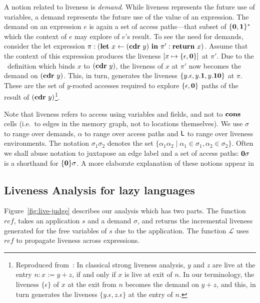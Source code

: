 \documentclass[9pt]{sigplanconf}
\begin{document}
A  notion  related  to  liveness  is  {\em  demand}.   While  liveness
represents the future use of variables, a demand represents the future
use of the value of an  expression. The demand on an expression $e$ is
again a  set of  access paths---that subset  of $\{\mathbf{0},\mathbf{1}\}^\ast$
which the context of $e$ may explore of $e$'s result.  To see the need
for  demands,  consider   the  let  expression  $\pi:(\mbox{$\mathbf{ let}$}~x\leftarrow
(\mbox{$\mathbf{cdr}$}~y)~\mbox{$\mathbf{ in}$}~  \pi':\mbox{$\mathbf{ return}$}~x)$.   Assume that  the  context of  this
expression produces  the liveness $[x \mapsto  \lbrace \epsilon, \mathbf{0}
  \rbrace]$ at $\pi'$.  Due to the \LET\ definition which binds $x$ to
$(\mbox{$\mathbf{cdr}$}~y)$, the  liveness of $x$ at  $\pi'$ now becomes  the demand on
$(\mbox{$\mathbf{cdr}$}~y)$.    This,  in   turn,  generates   the   liveness  $\lbrace
y.\epsilon, y.\mathbf{1}, y.\mathbf{1}\mathbf{0} \rbrace$ at $\pi$. These are the set
of $y$-rooted  accesses required  to explore $\lbrace  \epsilon, \mathbf{0}
\rbrace$  paths   of  the  result   of  $(\mbox{$\mathbf{cdr}$}~y)$\footnote{Reproduced
  from~\cite{asati14lgc}: In  classical strong liveness  analysis, $y$
  and $z$  are live at the  entry $n: x:=y+z$,  if and only if  $x$ is
  live  at exit  of $n$.   In our  terminology, the  liveness $\lbrace
  \epsilon\rbrace $ of $x$ at the  exit from $n$ becomes the demand on
  $y+z$, and this, in turn generates the liveness $\lbrace y.\epsilon,
  z.\epsilon \rbrace$ at the entry of $n$.}.


Note that  liveness refers to  access using variables and  fields, and
not  to $\mbox{$\mathbf{cons}$}$  cells (i.e.\  to edges  in the  memory graph,  not to
locations themselves).
We use $\sigma$  to range over demands, $\alpha$  to range over access
paths  and $\mathsf{L}$ to  range over  liveness environments.   The notation
$\sigma_1\sigma_2$  denotes  the  set $\lbrace  \alpha_1\alpha_2  \mid
\alpha_1 \in \sigma_1, \alpha_2  \in \sigma_2\rbrace$.  Often we shall
abuse notation to  juxtapose an edge label and a  set of access paths:
$\mathbf{0}\sigma$ is a shorthand for $\lbrace\mathbf{0}\rbrace\sigma$. A more
elaborate explanation of these notions appear in \cite{asati14lgc}


\subsection{Liveness Analysis for lazy languages}
\label{sec:liveness-analysis}
Figure~\ref{fig:live-judge}  describes  our  analysis  which  has  two
parts. The function $\mathit{ref}$,  takes  an application $s$ and
a demand $\sigma$, and returns  the incremental liveness generated for the
free  variables   of  $s$  due  to  the   application.   The  function
$\mathcal{L}$  uses   $\mathit{ref}$  to  propagate   liveness  across
expressions.
\end{document}
